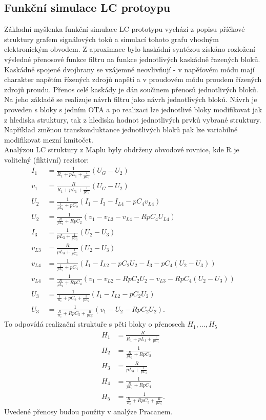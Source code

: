 \subsection{Funkční simulace LC protoypu}\label{s:KASK}
Základní myšlenka funkční simulace LC prototypu vychází z popisu příčkové struktury grafem signálových toků a simulací tohoto grafu vhodným elektronickým obvodem. Z aproximace bylo kaskádní syntézou získáno rozložení výsledné přenosové funkce filtru na funkce jednotlivých kaskádně řazených bloků. Kaskádně spojené dvojbrany se vzájemně neovlivňují - v napěťovém módu mají charakter napětím řízených zdrojů napětí a v proudovém módu proudem řízených zdrojů proudu. Přenos celé kaskády je dán součinem přenosů jednotlivých bloků. Na jeho základě se realizuje návrh filtru jako návrh jednotlivých bloků. Návrh je proveden s bloky s jedním OTA a po realizaci lze jednotlivé bloky modifikovat jak z hlediska struktury, tak z hlediska hodnot jednotlivých prvků vybrané struktury. Například změnou transkonduktance jednotlivých bloků pak lze variabilně modifikovat mezní kmitočet.\\
\noindent Analýzou LC struktury z Maplu byly obdrženy obvodové rovnice, kde R je volitelný (fiktivní) rezistor:
\begin{align}
I_1 &= \frac{1}{R_1 + pL_1 + \frac{1}{pC_1}}(U_G - U_2)\\
v_1 & = \frac{R}{R_1 + pL_1 + \frac{1}{pC_1}}(U_G - U_2)\\
U_2 &= \frac{1}{\frac{1}{pL_2} + pC_2}(I_1 - I_{3} - I_{L4} - pC_4 v_{L4})\\
U_2 &= \frac{1}{\frac{R}{pL_2} + RpC_2}(v_1 - v_{L3} - v_{L4} - RpC_4 U_{L4})\\
I_{3} &= \frac{1}{pL_3 + \frac{1}{pC_3}}(U_2 - U_3)\\
v_{L3} &= \frac{R}{pL_3 + \frac{1}{pC_3}}(U_2 - U_3)\\
v_{L4} &= \frac{1}{\frac{1}{pL_4}+pC_4}(I_1 - I_{L2} - pC_2U_2 - I_{3} - pC_4 (U_2 - U_3))\\
v_{L4} &= \frac{1}{\frac{R}{pL_4}+RpC_4}(v_1 - v_{L2} - RpC_2U_2 - v_{L3} - RpC_4 (U_2 - U_3))\\
U_3 &= \frac{1}{\frac{1}{R_z}+pC_5 + \frac{1}{pL_5}}(I_1 - I_{L2} - pC_2U_2)\\
U_3 &= \frac{1}{\frac{R}{R_z}+RpC_5 + \frac{R}{pL_5}}(v_1 - U_2 - RpC_2 U_2).
\end{align}
\noindent To odpovídá realizační struktuře s pěti bloky o přenosech $H_1, \ldots,H_5$
\begin{align}
H_1 & = \frac{R}{R_1 + pL_1 + \frac{1}{pC_1}}\\
H_2 &= \frac{1}{\frac{R}{pL_2} + RpC_2}\\
H_3 &= \frac{R}{pL_3 + \frac{1}{pC_3}}\\
H_4 &= \frac{1}{\frac{R}{pL_4}+RpC_4}\\
H_5 &= \frac{1}{\frac{R}{R_z}+RpC_5 + \frac{R}{pL_5}}.
\end{align}
\noindent Uvedené přenosy budou použity v analýze Pracanem.

